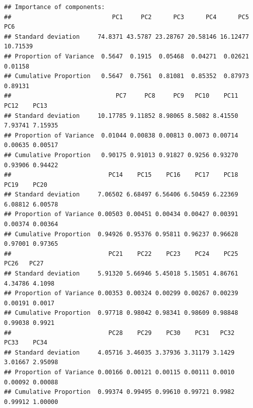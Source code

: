 \documentclass[
]{article}
\newenvironment{Shaded}{\begin{snugshade}}{\end{snugshade}}
\newcommand{\DecValTok}[1]{\textcolor[rgb]{0.00,0.00,0.81}{#1}}
\newcommand{\NormalTok}[1]{#1}
\newcommand{\SpecialCharTok}[1]{\textcolor[rgb]{0.00,0.00,0.00}{#1}}
\theoremstyle{definition}
\theoremstyle{definition}
\theoremstyle{definition}
\theoremstyle{definition}
\theoremstyle{remark}
\begin{document}
\begin{verbatim}
## Importance of components:
##                            PC1     PC2      PC3      PC4      PC5      PC6
## Standard deviation     74.8371 43.5787 23.28767 20.58146 16.12477 10.71539
## Proportion of Variance  0.5647  0.1915  0.05468  0.04271  0.02621  0.01158
## Cumulative Proportion   0.5647  0.7561  0.81081  0.85352  0.87973  0.89131
##                             PC7     PC8     PC9   PC10    PC11    PC12    PC13
## Standard deviation     10.17785 9.11852 8.98065 8.5082 8.41550 7.93741 7.15935
## Proportion of Variance  0.01044 0.00838 0.00813 0.0073 0.00714 0.00635 0.00517
## Cumulative Proportion   0.90175 0.91013 0.91827 0.9256 0.93270 0.93906 0.94422
##                           PC14    PC15    PC16    PC17    PC18    PC19    PC20
## Standard deviation     7.06502 6.68497 6.56406 6.50459 6.22369 6.08812 6.00578
## Proportion of Variance 0.00503 0.00451 0.00434 0.00427 0.00391 0.00374 0.00364
## Cumulative Proportion  0.94926 0.95376 0.95811 0.96237 0.96628 0.97001 0.97365
##                           PC21    PC22    PC23    PC24    PC25    PC26   PC27
## Standard deviation     5.91320 5.66946 5.45018 5.15051 4.86761 4.34786 4.1098
## Proportion of Variance 0.00353 0.00324 0.00299 0.00267 0.00239 0.00191 0.0017
## Cumulative Proportion  0.97718 0.98042 0.98341 0.98609 0.98848 0.99038 0.9921
##                           PC28    PC29    PC30    PC31   PC32    PC33    PC34
## Standard deviation     4.05716 3.46035 3.37936 3.31179 3.1429 3.01667 2.95098
## Proportion of Variance 0.00166 0.00121 0.00115 0.00111 0.0010 0.00092 0.00088
## Cumulative Proportion  0.99374 0.99495 0.99610 0.99721 0.9982 0.99912 1.00000
\end{verbatim}

\begin{Shaded}
\end{Shaded}
\end{document}
